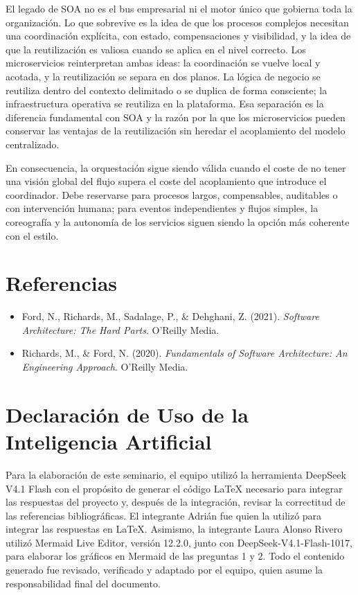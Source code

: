 \documentclass[12pt,a4paper]{article}
\begin{document}
El legado de SOA no es el bus empresarial ni el motor único que gobierna toda la organización. Lo que sobrevive es la idea de que los procesos complejos necesitan una coordinación explícita, con estado, compensaciones y visibilidad, y la idea de que la reutilización es valiosa cuando se aplica en el nivel correcto. Los microservicios reinterpretan ambas ideas: la coordinación se vuelve local y acotada, y la reutilización se separa en dos planos. La lógica de negocio se reutiliza dentro del contexto delimitado o se duplica de forma consciente; la infraestructura operativa se reutiliza en la plataforma. Esa separación es la diferencia fundamental con SOA y la razón por la que los microservicios pueden conservar las ventajas de la reutilización sin heredar el acoplamiento del modelo centralizado.

En consecuencia, la orquestación sigue siendo válida cuando el coste de no tener una visión global del flujo supera el coste del acoplamiento que introduce el coordinador. Debe reservarse para procesos largos, compensables, auditables o con intervención humana; para eventos independientes y flujos simples, la coreografía y la autonomía de los servicios siguen siendo la opción más coherente con el estilo.

\section*{Referencias}

\begin{itemize}[label={},leftmargin=0pt,itemsep=0.45em]
  \item Ford, N., Richards, M., Sadalage, P., \& Dehghani, Z. (2021). \emph{Software Architecture: The Hard Parts}. O'Reilly Media.
  \item Richards, M., \& Ford, N. (2020). \emph{Fundamentals of Software Architecture: An Engineering Approach}. O'Reilly Media.
\end{itemize}

\section*{Declaración de Uso de la Inteligencia Artificial}

Para la elaboración de este seminario, el equipo utilizó la herramienta DeepSeek V4.1 Flash con el propósito de generar el código LaTeX necesario para integrar las respuestas del proyecto y, después de la integración, revisar la correctitud de las referencias bibliográficas. El integrante Adrián fue quien la utilizó para integrar las respuestas en LaTeX. Asimismo, la integrante Laura Alonso Rivero utilizó Mermaid Live Editor, versión 12.2.0, junto con DeepSeek-V4.1-Flash-1017, para elaborar los gráficos en Mermaid de las preguntas 1 y 2. Todo el contenido generado fue revisado, verificado y adaptado por el equipo, quien asume la responsabilidad final del documento.
\end{document}
